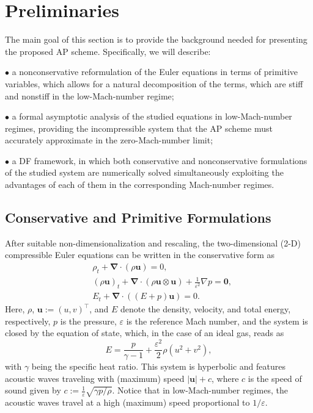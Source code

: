\documentclass[preprint,12pt]{elsarticle}
\def\bnabla{\bm{\nabla}}
\newcommand{\ve}{\varepsilon}
\begin{document}
\section{Preliminaries}\label{sec2}
The main goal of this section is to provide the background needed for presenting the proposed AP scheme. Specifically, we will describe:

\smallskip
\noindent
$\bullet$ a nonconservative reformulation of the Euler equations in terms of primitive variables, which allows for a natural decomposition
of the terms, which are stiff and nonstiff in the low-Mach-number regime;

\smallskip
\noindent
$\bullet$ a formal asymptotic analysis of the studied equations in low-Mach-number regimes, providing the incompressible system that the AP
scheme must accurately approximate in the zero-Mach-number limit;

\smallskip
\noindent
$\bullet$
a DF framework, in which both conservative and nonconservative formulations of the studied system are numerically solved simultaneously
exploiting the advantages of each of them in the corresponding Mach-number regimes.

\subsection{Conservative and Primitive Formulations}\label{sec21}
After suitable non-dimensionalization and rescaling, the two-dimensional (2-D) compressible Euler equations can be written in the
conservative form as
\begin{align}
	&\rho_t+\bnabla\!\cdot\!(\rho\bm u)=0,\label{2.1a}\\
	&(\rho\bm u)_t+\bnabla\!\cdot\!(\rho\bm u\otimes\bm u)+\frac{1}{\ve^2}\nabla p=\bm0,\label{2.1b}\\
	&E_t+\bnabla\!\cdot\!((E+p)\bm u)=0.\label{2.1c}
\end{align}
Here, $\rho$, $\bm u:=(u,v)^\top$, and $E$ denote the density, velocity, and total energy, respectively, $p$ is the pressure, $\ve$ is the 
reference Mach number, and the system is closed by the equation of state, which, in the case of an ideal gas, reads as
\begin{equation}
	E=\frac{p}{\gamma-1}+\frac{\ve^2}{2}\rho(u^2+v^2),
	\label{2.1d}
\end{equation}
with $\gamma$ being the specific heat ratio. This system is hyperbolic and features acoustic waves traveling with (maximum) speed
$|\bm u|+c$, where $c$ is the speed of sound given by $c:=\frac{1}{\ve}\sqrt{\gamma p/\rho}$. Notice that in low-Mach-number regimes, the
acoustic waves travel at a high (maximum) speed proportional to $1/\ve$.
\end{document}
